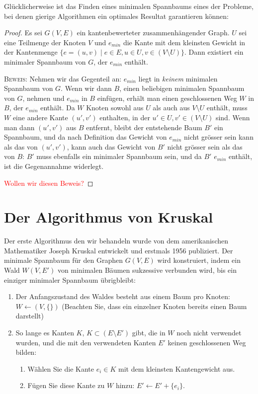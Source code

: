 \documentclass[12pt,a4paper]{report}
\theoremstyle{break}
\theoremstyle{plain}
\newtheorem{proof}{Satz}[section]
\begin{document}
Gl\"{u}cklicherweise ist das Finden eines minimalen Spannbaums eines
der Probleme, bei denen gierige Algorithmen ein optimales Resultat
garantieren k\"{o}nnen:

\begin{proof}\label{minimalkante}
  Es sei $G(V,E)$ ein kantenbewerteter
  zusammenh\"{a}ngender Graph. $U$ sei eine Teilmenge der Knoten $V$ und
  $e_{min}$ die Kante mit dem kleinsten Gewicht in der Kantenmenge
  $\{e=(u,v) \mid e\in E, u\in U, v\in (V\!\setminus\!U) \}$. Dann existiert ein
  minimaler Spannbaum von $G$, der $e_{min}$ enth\"{a}lt.

 \bigskip\noindent\textsc{Beweis:} Nehmen wir das Gegenteil an: $e_{min}$
liegt in \emph{keinem} minimalen Spannbaum von $G$. Wenn wir dann $B$,
einen beliebigen minimalen Spannbaum von $G$, nehmen und $e_{min}$ in $B$
einf\"{u}gen, erh\"{a}lt man einen geschlossenen Weg $W$ in $B$, der
$e_{min}$ enth\"{a}lt. Da $W$ Knoten sowohl aus $U$ als auch aus
$V\!\setminus\!U$ enth\"{a}lt, muss $W$ eine andere Kante $(u', v')$
enthalten, in der $u' \in U, v'\in (V\!\setminus\!U)$ sind. Wenn man
dann $(u',v')$ aus $B$ entfernt, bleibt der entstehende Baum $B'$ ein Spannbaum, und da nach
Definition das Gewicht von $e_{min}$ nicht gr\"{o}sser sein kann als
das von $(u',v')$, kann auch das Gewicht von $B'$ nicht
gr\"{o}sser sein als das von $B$: $B'$ muss ebenfalls ein minimaler
Spannbaum sein, und da $B'$ $e_{min}$ enth\"{a}lt, ist die
Gegenannahme widerlegt.

\textcolor{red}{Wollen wir diesen Beweis?}
\end{proof} 

\section{Der Algorithmus von Kruskal}

Der erste Algorithmus den wir behandeln wurde von dem
amerikanischen Mathematiker Joseph Kruskal entwickelt und erstmals
1956 publiziert. Der minimale Spannbaum f\"{u}r den Graphen $G(V,E)$
wird konstruiert, indem ein Wald $W(V, E')$ von minimalen B\"{a}umen
sukzessive verbunden wird, bis ein einziger minimaler Spannbaum
\"ubrigbleibt:

\begin{enumerate}
\item Der Anfangszustand des Waldes besteht aus einem Baum pro Knoten:
  $W \gets (V, \{\})$ (Beachten Sie, dass ein
  einzelner Knoten bereits einen Baum darstellt)
\item So lange es Kanten $K$, $K\subset (E\setminus{E'})$ gibt, die in $W$ noch nicht
  verwendet wurden, und die mit den verwendeten Kanten $E'$ keinen
  geschlossenen Weg bilden:
\begin{enumerate}
\item W\"{a}hlen Sie die Kante $e_i\in K$ mit dem kleinsten
  Kantengewicht aus.
\item F\"{u}gen Sie diese Kante zu $W$ hinzu: $E' \gets E'+\{e_i\}$.
\end{enumerate}
\end{enumerate}
\end{document}
